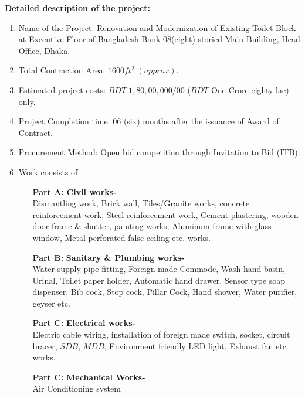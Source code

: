 \documentclass[11pt,a4paper]{article}
\begin{document}
		\textbf{Detailed description of the project:}
		\begin{enumerate}
			\item 	Name of the Project: Renovation and Modernization of Existing Toilet Block at Executive Floor of Bangladesh Bank 08(eight) storied Main Building, Head Office, Dhaka.
			\item	Total Contraction Area: $1600 ft^2 \;(approx).$ 
			\item 	Estimated project costs: $BDT\; 1,80,00,000/00$ ($BDT$ One Crore eighty lac) only.
			\item 	Project Completion time: 06 (six) months after the issuance of Award of Contract.
			\item 	Procurement Method: Open bid competition through Invitation to Bid (ITB).
			\item Work consists of:
			\begin{itemize}
				\item[\bf Part A:]
				{\bf  Civil works-}\\Dismantling work, Brick wall, Tiles/Granite works, concrete reinforcement work, Steel reinforcement work, Cement plastering, wooden door frame \& shutter, painting works, Aluminum frame with glass window, Metal perforated false ceiling etc. works.
				\item[\bf Part B:]
				{\bf Sanitary \& Plumbing works-}\\Water supply pipe fitting, Foreign made Commode, Wash hand basin, Urinal, Toilet paper holder, Automatic hand drawer, Sensor type soap dispenser, Bib cock, Stop cock, Pillar Cock, Hand shower, Water purifier, geyser etc.
				\item[\bf Part C:]
				\textbf{Electrical works-}\\Electric cable wiring, installation of foreign made switch, socket, circuit bracer, $SDB$, $MDB$, Environment friendly LED light, Exhaust fan etc. works.
				\item[\bf Part C:]
				\textbf{Mechanical Works-}\\Air Conditioning system
				
				
				
			\end{itemize}
			
		\end{enumerate}
		
	
	
\end{document}
